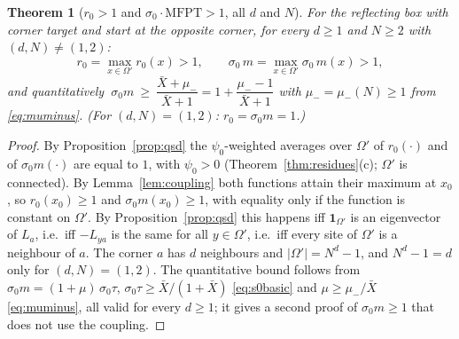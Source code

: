 \documentclass[11pt,a4paper]{article}
\newcommand{\one}{\mathbf 1}
\newcommand{\Xb}{\bar X}
\theoremstyle{plain}
\newtheorem{theorem}{Theorem}[section]
\theoremstyle{definition}
\numberwithin{equation}{section}
\begin{document}
\begin{theorem}[$r_0>1$ and $\sigma_0\cdot\mathrm{MFPT}>1$, all $d$ and $N$]\label{thm:r0gt1}
For the reflecting box with corner target and start at the opposite corner, for every $d\ge1$ and $N\ge2$ with $(d,N)\ne(1,2)$:
\[
r_0=\max_{x\in\Omega'}r_0(x)>1,\qquad \sigma_0\,m=\max_{x\in\Omega'}\sigma_0\,m(x)>1 ,
\]
and quantitatively $\ \sigma_0m\ \ge\ \dfrac{\Xb+\mu_-}{\Xb+1}=1+\dfrac{\mu_--1}{\Xb+1}$ with $\mu_-=\mu_-(N)\ge1$ from \eqref{eq:muminus}. (For $(d,N)=(1,2)$: $r_0=\sigma_0m=1$.)
\end{theorem}
\begin{proof}
By Proposition~\ref{prop:qsd} the $\psi_0$-weighted averages over $\Omega'$ of $r_0(\cdot)$ and of $\sigma_0m(\cdot)$ are equal to $1$, with $\psi_0>0$ (Theorem~\ref{thm:residues}(c); $\Omega'$ is connected). By Lemma~\ref{lem:coupling} both functions attain their maximum at $x_0$, so $r_0(x_0)\ge1$ and $\sigma_0m(x_0)\ge1$, with equality only if the function is constant on $\Omega'$. By Proposition~\ref{prop:qsd} this happens iff $\one_{\Omega'}$ is an eigenvector of $L_a$, i.e.\ iff $-L_{ya}$ is the same for all $y\in\Omega'$, i.e.\ iff every site of $\Omega'$ is a neighbour of $a$. The corner $a$ has $d$ neighbours and $|\Omega'|=N^d-1$, and $N^d-1=d$ only for $(d,N)=(1,2)$. The quantitative bound follows from $\sigma_0m=(1+\mu)\,\sigma_0\tau$, $\sigma_0\tau\ge\Xb/(1+\Xb)$ \eqref{eq:s0basic} and $\mu\ge\mu_-/\Xb$ \eqref{eq:muminus}, all valid for every $d\ge1$; it gives a second proof of $\sigma_0m\ge1$ that does not use the coupling.
\end{proof}
\end{document}

